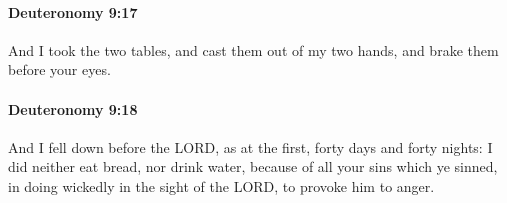 		\paragraph{Deuteronomy 9:17} %
			\label{DEUTERONOMY-9-17}

			And I took the two tables, and cast them out of my two hands, and brake them before your eyes.


		\paragraph{Deuteronomy 9:18} %
			\label{DEUTERONOMY-9-18}

			And I fell down before the LORD, as at the first, forty days and forty nights: I did neither eat bread, nor drink water, because of all your sins which ye sinned, in doing wickedly in the sight of the LORD, to provoke him to anger.


